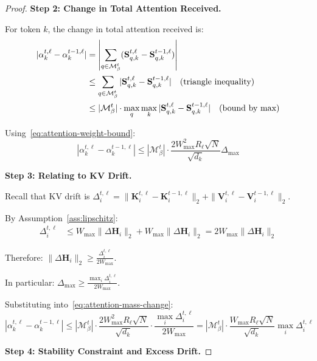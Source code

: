 \documentclass{article} %
\theoremstyle{definition}
\theoremstyle{remark}
\begin{document}
\begin{proof}
\textbf{Step 2: Change in Total Attention Received.}

For token $k$, the change in total attention received is:
\begin{align}
|\alpha^{t,\ell}_k - \alpha^{t-1,\ell}_k| &= \left|\sum_{q \in \mathcal{M}^t_\beta} (\mathbf{S}^{t,\ell}_{q,k} - \mathbf{S}^{t-1,\ell}_{q,k})\right|\notag\\
&\leq \sum_{q \in \mathcal{M}^t_\beta} |\mathbf{S}^{t,\ell}_{q,k} - \mathbf{S}^{t-1,\ell}_{q,k}| \quad \text{(triangle inequality)}\notag\\
&\leq |\mathcal{M}^t_\beta| \cdot \max_q \max_k |\mathbf{S}^{t,\ell}_{q,k} - \mathbf{S}^{t-1,\ell}_{q,k}| \quad \text{(bound by max)}
\end{align}

Using~\eqref{eq:attention-weight-bound}:
\begin{equation}\label{eq:attention-mass-change}
|\alpha^{t,\ell}_k - \alpha^{t-1,\ell}_k| \leq |\mathcal{M}^t_\beta| \cdot \frac{2W_{\max}^2 R_\ell \sqrt{N}}{\sqrt{d_k}} \Delta_{\max}
\end{equation}

\textbf{Step 3: Relating to KV Drift.}

Recall that KV drift is $\Delta^{t,\ell}_i = \|\mathbf{K}^{t,\ell}_i - \mathbf{K}^{t-1,\ell}_i\|_2 + \|\mathbf{V}^{t,\ell}_i - \mathbf{V}^{t-1,\ell}_i\|_2$.

By Assumption~\ref{ass:lipschitz}:
\begin{align}
\Delta^{t,\ell}_i &\leq W_{\max} \|\Delta\mathbf{H}_i\|_2 + W_{\max} \|\Delta\mathbf{H}_i\|_2 = 2W_{\max} \|\Delta\mathbf{H}_i\|_2
\end{align}

Therefore: $\|\Delta\mathbf{H}_i\|_2 \geq \frac{\Delta^{t,\ell}_i}{2W_{\max}}$.

In particular: $\Delta_{\max} \geq \frac{\max_i \Delta^{t,\ell}_i}{2W_{\max}}$.

Substituting into~\eqref{eq:attention-mass-change}:
\begin{equation}\label{eq:attention-vs-drift}
|\alpha^{t,\ell}_k - \alpha^{t-1,\ell}_k| \leq |\mathcal{M}^t_\beta| \cdot \frac{2W_{\max}^2 R_\ell \sqrt{N}}{\sqrt{d_k}} \cdot \frac{\max_i \Delta^{t,\ell}_i}{2W_{\max}} = |\mathcal{M}^t_\beta| \cdot \frac{W_{\max} R_\ell \sqrt{N}}{\sqrt{d_k}} \max_i \Delta^{t,\ell}_i
\end{equation}

\textbf{Step 4: Stability Constraint and Excess Drift.}


\end{proof}
\end{document}
